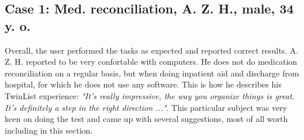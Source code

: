 \documentclass{chi2009}
\begin{document}
\subsection{Case 1: Med. reconciliation, A. Z. H., male, 34 y. o.}

Overall, the user performed the tasks as expected and reported correct results. A. Z. H. reported to be very confortable with computers. He does not do medication reconciliation on a regular basis, but when doing inpatient aid and discharge from hospital, for which he does not use any software. This is how he describes his TwinList experience: \textit{"It's really impressive, the way you organize things is great. It's definitely a step in the right direction ..."}. This particular subject was very keen on doing the test and came up with several suggestions, most of all worth including in this section. 
\end{document}
